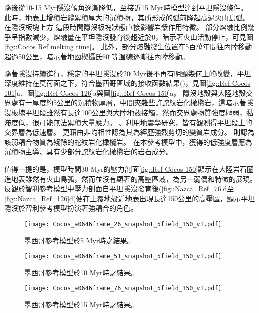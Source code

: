 隨後從10-15 Myr隱沒傾角逐漸降低，至接近15 Myr時模型達到平坦隱沒條件。
此時，地表上增積岩體累積厚大的沉積物，其所形成的弧前隆起高過火山島弧。
在隱沒板塊上方
這段時間隱沒板塊狀態直接影響岩漿作用特徵。
部分熔融比例幾乎呈指數減少，熔融量在平坦隱沒發育後趨近於0，暗示著火山活動停止，可見圖\ref{fig::Cocos Ref melting time}。
此外，部分熔融發生位置在5百萬年間往內陸移動超過50公里，暗示著地函楔攝氏60$^{\circ}$等溫線逐漸往內陸移動。

隨著隱沒持續進行，穩定的平坦隱沒於20 Myr後不再有明顯幾何上的改變，平坦深度維持在莫荷面之下，符合墨西哥區域的接收函數結果(\citealp{PerezCampos2008})，見圖\ref{fig::Ref Cocos 101}a、圖\ref{fig::Ref Cocos 126}a與圖\ref{fig::Ref Cocos 150}a。
隱沒地殼與大陸地殼交界處有一厚度約5公里的沉積物厚層，中間夾雜些許蛇紋岩化橄欖岩，這暗示著隱沒板塊平坦段雖然有長達100公里與大陸地殼接觸，然而交界處物質強度極弱，黏滯度低，很可能無法累積大量應力。
\citealp{Song2009}、\citealp{Song2012SC}利用地震學研究，皆有觀測得平坦段上的交界層為低速層。
\citealp{Song2012SC}更藉由非均相性認為其為經歷強烈剪切的變質岩成分。
\citealp{Manea2017}則認為該弱耦合物質為殘餘的蛇紋岩化橄欖岩。
在本參考模型中，獲得的低強度層應為沉積物主導、具有少部分蛇紋岩化橄欖岩的岩石成分。

值得一提的是，模型時間30 Myr的壓力剖面\ref{fig::Ref Cocos 150}顯示在大陸岩石圈進地表雖然有火山島弧，然而並沒有顯著的高壓區域，為另一弱偶和特徵的展現。
反觀於智利參考模型中壓力剖面自平坦隱沒發育後(\ref{fig::Nazca_Ref_76}d至\ref{fig::Nazca_Ref_126}d)便在上覆地殼近地表出現長達150公里的高壓區，顯示平坦隱沒於智利參考模型扮演著強耦合的角色。

\begin{figure*}[htp]
    \centering
    \texttt{[image: Cocos\_a0646frame\_26\_snapshot\_5field\_150\_v1.pdf]}
    \caption[墨西哥參考模型於5 Myr時之結果]{墨西哥參考模型於5 Myr時之結果。}
    \label{fig::Ref Cocos 26}
\end{figure*}

\begin{figure*}[htp]
    \centering
    \texttt{[image: Cocos\_a0646frame\_51\_snapshot\_5field\_150\_v1.pdf]}
    \caption[墨西哥參考模型於10 Myr時之結果]{墨西哥參考模型於10 Myr時之結果。}
    \label{fig::Ref Cocos 51}
\end{figure*}

\begin{figure*}[htp]
    \centering
    \texttt{[image: Cocos\_a0646frame\_76\_snapshot\_5field\_150\_v1.pdf]}
    \caption[墨西哥參考模型於15 Myr時之結果]{墨西哥參考模型於15 Myr時之結果。}
    \label{fig::Ref Cocos 76}
\end{figure*}

